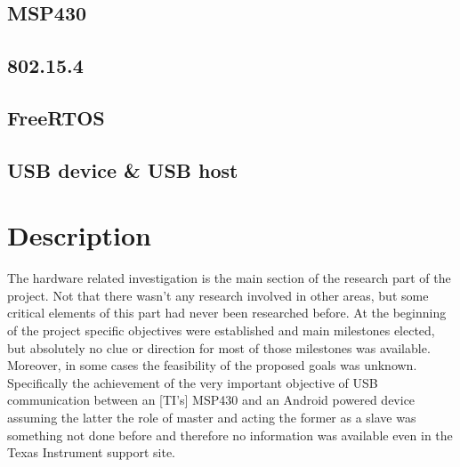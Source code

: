 		\subsection{MSP430}
		\subsection{802.15.4}
		\subsection{FreeRTOS}
		\subsection{USB device \& USB host}

	\section{Description}



	The hardware related investigation is the main section of the research part of the project. Not that there wasn't any research involved in other areas, but some critical elements of this part had never been researched before. 
	At the beginning of the project specific objectives were established and main milestones elected, but absolutely no clue or direction for most of those milestones was available.
	Moreover, in some cases the feasibility of the proposed goals was unknown. Specifically the achievement of the very important objective of USB communication between an [TI's] MSP430 %
	and an Android powered device assuming the latter the role of master and acting the former as a slave was something not done before and therefore no information was available  even in the Texas Instrument support site.\\

